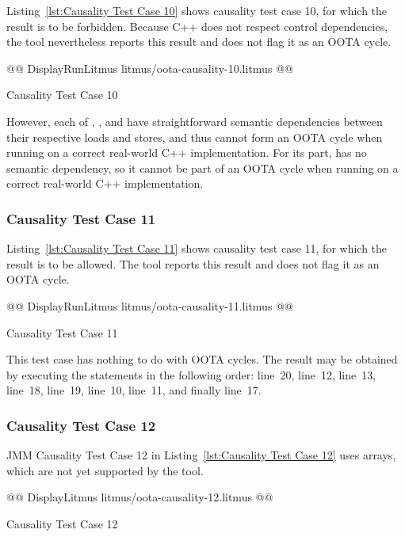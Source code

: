 \documentclass[10]{article}
\begin{document}
Listing~\ref{lst:Causality Test Case 10}
shows causality test case 10, for which the 
result is to be forbidden.
Because C++ does not respect control dependencies, the  tool
nevertheless reports this result and does not flag it as an OOTA cycle.

\begin{listing}[tbp]
@@ DisplayRunLitmus litmus/oota-causality-10.litmus @@
\caption{Causality Test Case 10}
\label{lst:Causality Test Case 10}
\end{listing}

However, each of , , and  have straightforward
semantic dependencies between their respective loads and stores, and
thus cannot form an OOTA cycle when running on a correct real-world C++
implementation.
For its part,  has no semantic dependency, so it cannot be part
of an OOTA cycle when running on a correct real-world C++ implementation.

\subsubsection{Causality Test Case 11}
\label{app:Causality Test Case 11}

Listing~\ref{lst:Causality Test Case 11}
shows causality test case 11, for which the 
result is to be allowed.
The  tool reports this result and does not flag it as an OOTA cycle.

\begin{listing}[tbp]
@@ DisplayRunLitmus litmus/oota-causality-11.litmus @@
\caption{Causality Test Case 11}
\label{lst:Causality Test Case 11}
\end{listing}

This test case has nothing to do with OOTA cycles.
The result may be obtained by executing the statements in the following
order: line~20, line~12, line~13, line~18, line~19, line~10, line~11,
and finally line~17.

\subsubsection{Causality Test Case 12}
\label{app:Causality Test Case 12}

JMM Causality Test Case 12 in
Listing~\ref{lst:Causality Test Case 12}
uses arrays, which are not yet supported by the  tool.

\begin{listing}[tbp]
@@ DisplayLitmus litmus/oota-causality-12.litmus @@
\caption{Causality Test Case 12}
\label{lst:Causality Test Case 12}
\end{listing}
\end{document}
